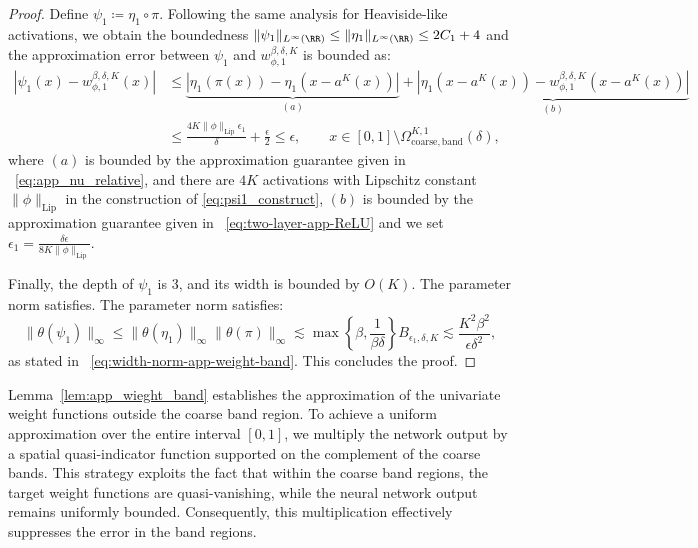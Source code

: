 \documentclass[11pt]{article}
\begin{document}
\begin{proof}
    Define $\psi_1 \coloneqq \eta_1 \circ \pi$. Following the same analysis for Heaviside-like activations, we obtain the boundedness $ \|\psi_1 \|_{L^{\infty}(\RR)} \leq \|\eta_1\|_{L^{\infty}(\RR)} \leq 2C_1 + 4$ and the approximation error between $\psi_1$ and $w_{\phi,1}^{\beta, \delta, K}$ is bounded as:
    \begin{equation*}
        \begin{aligned}
            |\psi_1(x) - w_{\phi,1}^{\beta, \delta, K}(x)| & \leq \underbrace{|\eta_1 (\pi(x)) - \eta_1(x- a^K(x))|}_{(a)}  + \underbrace{|\eta_1(x - a^K(x)) - w_{\phi,1}^{\beta, \delta,K}(x - a^K(x)) |}_{(b)}\\
            & \leq \frac{4  K\|\phi\|_{\mathrm{Lip}} \epsilon_1}{\delta} + \frac{\epsilon}{2} \leq \epsilon, \qquad   x \in [0,1] \setminus \Omega_{\mathrm{coarse, band}}^{K,1}({\delta}),
        \end{aligned}
    \end{equation*}
    where $(a)$ is bounded by the approximation guarantee given in ~\eqref{eq:app_nu_relative}, and there are $4K$ activations with Lipschitz constant $\|\phi\|_{\mathrm{Lip}}$ in the construction of \eqref{eq:psi1_construct}, $(b)$ is bounded by the approximation guarantee given in ~\eqref{eq:two-layer-app-ReLU} and we set $\epsilon_1 = \frac{\delta \epsilon}{8 K\|\phi\|_{\mathrm{Lip}}}$. 


    Finally, the depth of $\psi_1$ is 3, and its width is bounded by ${O}(K)$. The parameter norm satisfies. The parameter norm satisfies:
    \begin{equation*}
         \|\theta(\psi_1)\|_{\infty} \leq \|\theta(\eta_1)\|_{\infty}  \|\theta(\pi)\|_{\infty} \lesssim \max \left\{ \beta, \frac{1}{\beta \delta}\right\} B_{\epsilon_1, {\delta},K} \lesssim \frac{K^2 \beta^2}{\epsilon  \delta^2},
    \end{equation*}
    as stated in ~\eqref{eq:width-norm-app-weight-band}. This concludes the proof.
\end{proof}


Lemma~\ref{lem:app_wieght_band} establishes the approximation of the univariate weight functions outside the coarse band region. To achieve a uniform approximation over the entire interval $[0,1]$, we multiply the network output by a spatial quasi-indicator function supported on the complement of the coarse bands. This strategy exploits the fact that within the coarse band regions, the target weight functions are quasi-vanishing, while the neural network output remains uniformly bounded. Consequently, this multiplication effectively suppresses the error in the band regions.
\end{document}
